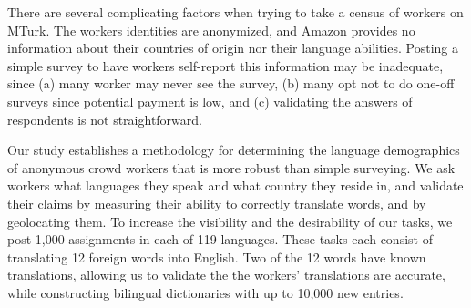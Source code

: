 \documentclass[11pt]{article}
\begin{document}

There are several complicating factors when trying to take a census of workers on MTurk.  The workers identities are anonymized, and Amazon provides no information about their countries of origin nor their language abilities.  Posting a simple survey to have workers self-report this information may be inadequate, since (a) many worker may never see the survey, (b) many opt not to do one-off surveys since potential payment is low, and (c) validating the answers of respondents is not straightforward. 

Our study establishes a methodology for determining the language demographics of anonymous crowd workers that is more robust than simple surveying. We ask workers what languages they speak and what country they reside in, and validate their claims by measuring their ability to correctly translate words, and by geolocating them.  To increase the visibility and the desirability of our tasks, we post 1,000 assignments in each of 119 languages.  These tasks each consist of translating 12 foreign words into English.  Two of the 12 words have known translations, allowing us to validate the the workers' translations are accurate, while constructing bilingual dictionaries with up to 10,000 new entries. 

\end{document}
